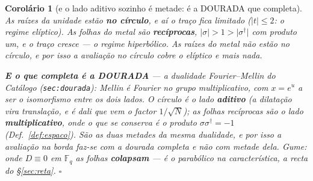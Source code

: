 \documentclass[11pt,a4paper]{article}
\newtheorem{corolario}[teorema]{Corolário}
\newcommand{\code}[1]{\texttt{\small #1}}
\newcommand{\abs}[1]{\lvert #1\rvert}
\newcommand{\dg}{^{\dagger}}
\begin{document}
\begin{corolario}[e o lado aditivo sozinho é metade: é a DOURADA que
completa]\label{cor:dourada-completa}
As raízes da unidade estão \textbf{no círculo}, e aí o traço fica \emph{limitado}
($\abs{t}\leq2$: o regime elíptico). As folhas do metal são \textbf{recíprocas},
$\abs{\sigma}>1>\abs{\sigma\dg}$ com produto um, e o traço \emph{cresce} --- o
regime hiperbólico. \emph{As raízes do metal não estão no círculo}, e por isso a
avaliação no círculo cobre o elíptico e mais nada.

\textbf{E o que completa é a DOURADA} --- a dualidade Fourier--Mellin do
\emph{Catálogo} (\code{sec:dourada}): \emph{Mellin é Fourier no grupo multiplicativo}, com
$x=e^{u}$ a ser o isomorfismo entre os dois lados. O círculo é o lado \textbf{aditivo}
(a dilatação vira translação, e é dali que vem o factor $1/\sqrt N$); as folhas recíprocas
são o lado \textbf{multiplicativo}, onde o que se conserva é o \emph{produto}
$\sigma\sigma\dg=-1$ (Def.~\ref{def:espaco}). \emph{São as duas metades da mesma
dualidade}, e por isso a avaliação na borda faz-se com a dourada completa e não com metade
dela. \emph{Gume}: onde $D\equiv0$
em $\mathbb{F}_q$ as folhas \textbf{colapsam} --- é o parabólico na
característica, a recta do \S\ref{sec:reta}. $\square$
\end{corolario}
\end{document}
